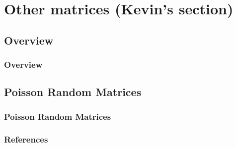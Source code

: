 \documentclass[aspectratio=34]{beamer}
\begin{document}
\section{Other matrices (Kevin's section)}

\subsection{Overview}
\begin{frame}
    \frametitle{Overview}
\end{frame}

\subsection{Poisson Random Matrices}
\begin{frame}
    \frametitle{Poisson Random Matrices}
\end{frame}

\begin{frame}[t,allowframebreaks]{}
\frametitle{References}



\end{frame}
\end{document}
